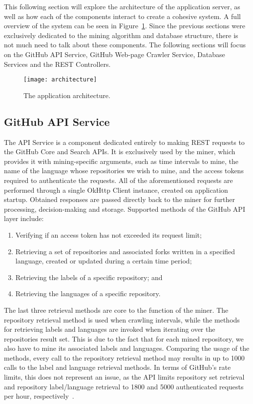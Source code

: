 This following section will explore the architecture of the application server, as well as how each of the components interact to create a cohesive system. A full overview of the system can be seen in Figure~\ref{fig:2}.
Since the previous sections were exclusively dedicated to the mining algorithm and database structure, there is not much need to talk about these components.
The following sections will focus on the GitHub API Service, GitHub Web-page Crawler Service, Database Services and the REST Controllers.

\begin{figure}[h!]
    \centering
    \texttt{[image: architecture]}
    \caption[Application architecture]{The application architecture.}
    \label{fig:2}
\end{figure}

\subsection{GitHub API Service}

The API Service is a component dedicated entirely to making REST requests to the GitHub Core and Search APIs.
It is exclusively used by the miner, which provides it with mining-specific arguments, such as time intervals to mine, the name of the language whose repositories we wish to mine, and the access tokens required to authenticate the requests.
All of the aforementioned requests are performed through a single OkHttp Client instance, created on application startup.
Obtained responses are passed directly back to the miner for further processing, decision-making and storage.
Supported methods of the GitHub API layer include:
\begin{enumerate}
    \item Verifying if an access token has not exceeded its request limit;
    \item Retrieving a set of repositories and associated forks written in a specified language, created or updated during a certain time period;
    \item Retrieving the labels of a specific repository; and
    \item Retrieving the languages of a specific repository.
\end{enumerate}

The last three retrieval methods are core to the function of the miner.
The repository retrieval method is used when crawling intervals, while the methods for retrieving labels and languages are invoked when iterating over the repositories result set.
This is due to the fact that for each mined repository, we also have to mine its associated labels and languages.
Comparing the usage of the methods, every call to the repository retrieval method may results in up to 1000 calls to the label and language retrieval methods.
In terms of GitHub's rate limits, this does not represent an issue, as the API limits repository set retrieval and repository label/language retrieval to 1800 and 5000 authenticated requests per hour, respectively~\cite{APISEARCH,RATELIMIT}.

